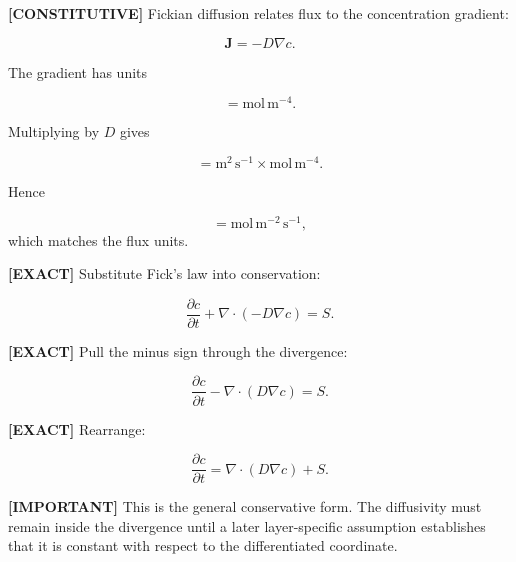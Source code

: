 \documentclass[11pt,a4paper]{article}
\begin{document}
\textbf{[CONSTITUTIVE]} Fickian diffusion relates flux to the concentration gradient:

\begin{equation}
\boxed{\mathbf J=-D\nabla c.}
\tag{TRISO-GOV-034}
\label{eq:triso-gov-034}
\end{equation}

The gradient has units

\begin{equation}
[\nabla c]=\mathrm{mol\,m^{-4}}.
\tag{TRISO-GOV-035}
\label{eq:triso-gov-035}
\end{equation}

Multiplying by $D$ gives

\begin{equation}
[D\nabla c]=\mathrm{m^2\,s^{-1}}\times\mathrm{mol\,m^{-4}}.
\tag{TRISO-GOV-036}
\label{eq:triso-gov-036}
\end{equation}

Hence

\begin{equation}
[D\nabla c]=\mathrm{mol\,m^{-2}\,s^{-1}},
\tag{TRISO-GOV-037}
\label{eq:triso-gov-037}
\end{equation}
which matches the flux units.

\textbf{[EXACT]} Substitute Fick's law into conservation:

\begin{equation}
\frac{\partial c}{\partial t}+\nabla\cdot(-D\nabla c)=S.
\tag{TRISO-GOV-038}
\label{eq:triso-gov-038}
\end{equation}

\textbf{[EXACT]} Pull the minus sign through the divergence:

\begin{equation}
\frac{\partial c}{\partial t}-\nabla\cdot(D\nabla c)=S.
\tag{TRISO-GOV-039}
\label{eq:triso-gov-039}
\end{equation}

\textbf{[EXACT]} Rearrange:

\begin{equation}
\boxed{\frac{\partial c}{\partial t}=\nabla\cdot(D\nabla c)+S.}
\tag{TRISO-GOV-040}
\label{eq:triso-gov-040}
\end{equation}

\textbf{[IMPORTANT]} This is the general conservative form. The diffusivity must remain inside the divergence until a later layer-specific assumption establishes that it is constant with respect to the differentiated coordinate.
\end{document}
